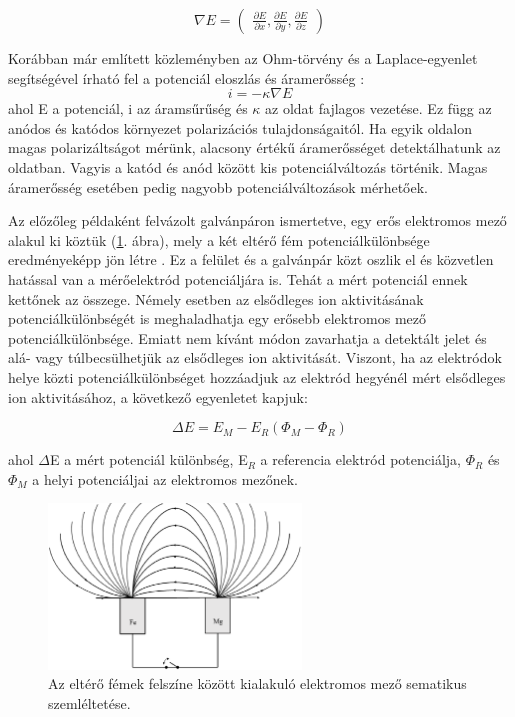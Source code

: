\begin{equation}
{\nabla E=\left(\begin{matrix}
\frac{\partial E}{\partial x} , 
\frac{\partial E}{\partial y} ,
\frac{\partial E}{\partial z}
\end{matrix}\right)}
\label{eq:nabla}
\end{equation}

Korábban már említett közleményben az Ohm-törvény és a Laplace-egyenlet segítségével írható fel a potenciál eloszlás és áramerősség \cite{isaacs1981scanning}:
\begin{equation}
{i} = - \kappa \nabla E
\label{eq:field1}
\end{equation}
ahol E a potenciál, i az áramsűrűség és $\kappa$ az oldat fajlagos vezetése. Ez függ az anódos és katódos környezet polarizációs tulajdonságaitól. Ha egyik oldalon magas polarizáltságot mérünk, alacsony értékű áramerősséget detektálhatunk az oldatban. Vagyis a katód és anód között kis potenciálváltozás történik. Magas áramerősség esetében pedig nagyobb potenciálváltozások mérhetőek.

Az előzőleg példaként felvázolt galvánpáron ismertetve, egy erős elektromos mező alakul ki köztük (\ref{fig:field}. ábra), mely a két eltérő fém potenciálkülönbsége eredményeképp jön létre \cite{kiss2017effect}. Ez a felület és a galvánpár közt oszlik el és közvetlen hatással van a mérőelektród potenciáljára is. Tehát a mért potenciál ennek kettőnek az összege. Némely esetben az elsődleges ion aktivitásának potenciálkülönbségét is meghaladhatja egy erősebb elektromos mező potenciálkülönbsége. Emiatt nem kívánt módon zavarhatja a detektált jelet és alá- vagy túlbecsülhetjük az elsődleges ion aktivitását. Viszont, ha az elektródok helye közti potenciálkülönbséget hozzáadjuk az elektród hegyénél mért elsődleges ion aktivitásához, a következő egyenletet kapjuk:

\begin{equation}
\Delta E = E_M - E_R (\Phi_M - \Phi_R) 
\label{eq:field1}
\end{equation}

ahol $\Delta$E a mért potenciál különbség, E$_R$ a referencia elektród potenciálja, $\Phi_R$ és $\Phi_M$ a helyi potenciáljai az elektromos mezőnek. 

\begin{figure}
\centering
\includegraphics[width=0.6\textwidth]{img/field.eps}
\caption{Az eltérő fémek felszíne között kialakuló elektromos mező sematikus szemléltetése.}
\label{fig:field}
\end{figure}

